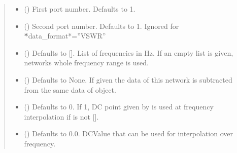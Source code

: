 \documentclass[letterpaper,10pt,english]{sphinxmanual}
\begin{document}
\begin{fulllineitems}
\begin{fulllineitems}
\begin{quote}
\begin{description}
\begin{itemize}
\item {} 
\sphinxAtStartPar
{} (\sphinxstyleliteralemphasis{\sphinxupquote{, }}) \textendash{} First port number. Defaults to 1.

\item {} 
\sphinxAtStartPar
{} (\sphinxstyleliteralemphasis{\sphinxupquote{, }}) \textendash{} Second port number. Defaults to 1. Ignored for {\color{red}\bfseries{}*}data\_format*=”VSWR”

\item {} 
\sphinxAtStartPar
{} (\sphinxstyleliteralemphasis{\sphinxupquote{, }}) \textendash{} Defaults to {[}{]}. List of frequencies in Hz. If an empty list is given, networks whole frequency range is used.

\item {} 
\sphinxAtStartPar
{} ({\hyperref[\detokenize{touchstone:touchstone.spfile}]{}}\sphinxstyleliteralemphasis{\sphinxupquote{, }}) \textendash{} Defaults to None. If given the data of this network is subtracted from the same data of  object.

\item {} 
\sphinxAtStartPar
{} (\sphinxstyleliteralemphasis{\sphinxupquote{, }}) \textendash{} Defaults to 0. If 1, DC point given by  is used at frequency interpolation if  is not {[}{]}.

\item {} 
\sphinxAtStartPar
{} (\sphinxstyleliteralemphasis{\sphinxupquote{, }}) \textendash{} Defaults to 0.0. DCValue that can be used for interpolation over frequency.


\end{itemize}
\end{description}
\end{quote}
\end{fulllineitems}
\end{fulllineitems}
\end{document}

